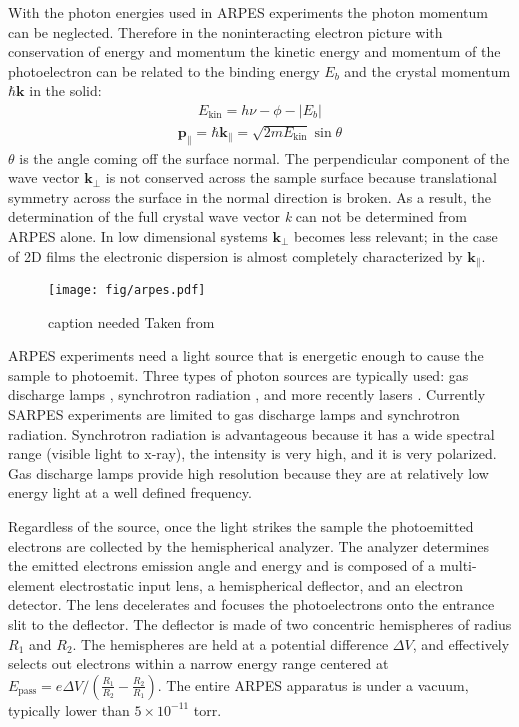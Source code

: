 \documentclass[12pt]{article}
\begin{document}
With the photon energies used in ARPES experiments the photon momentum can be neglected.
Therefore in the noninteracting electron picture with conservation of energy and momentum the kinetic energy and momentum of the photoelectron can be related to the binding energy $E_b$ and the crystal momentum $\hbar\boldsymbol{k}$ in the solid\cite{Damascelli}:
\begin{align}
  E_{\text{kin}}=h\nu-\phi-|E_b|
\end{align}
\begin{align}
  \boldsymbol{p_{\parallel}}=\hbar\boldsymbol{k_{\parallel}}=\sqrt{2mE_{\text{kin}}}\sin\theta
\end{align}
$\theta$ is the angle coming off the surface normal.
The perpendicular component of the wave vector $\boldsymbol{k_{\perp}}$ is not conserved across the sample surface because translational symmetry across the surface in the normal direction is broken.  
As a result, the determination of the full crystal wave vector \emph{k} can not be determined from ARPES alone.
In low dimensional systems $\boldsymbol{k_{\perp}}$ becomes less relevant; in the case of 2D films the electronic dispersion is almost completely characterized by $\boldsymbol{k_{\parallel}}$.

\begin{figure}[h]
  \centering
  \texttt{[image: fig/arpes.pdf]}
  \caption[should I put this here?]
  {caption needed Taken from \cite{Damascelli}}
  \label{fig:asymmetry}
\end{figure}
ARPES experiments need a light source that is energetic enough to cause the sample to photoemit.
Three types of photon sources are typically used:  gas discharge lamps \cite{Damascelli}, synchrotron radiation \cite{Damascelli}, and more recently lasers \cite{Dessau}.
Currently SARPES experiments are limited to gas discharge lamps and synchrotron radiation.
Synchrotron radiation is advantageous because it has a wide spectral range (visible light to x-ray), the intensity is very high, and it is very polarized.
Gas discharge lamps provide high resolution because they are at relatively low energy light at a well defined frequency.

Regardless of the source, once the light strikes the sample the photoemitted electrons are collected by the hemispherical analyzer.
The analyzer determines the emitted electrons emission angle and energy and is composed of a multi-element electrostatic input lens, a hemispherical deflector, and an electron detector.
The lens decelerates and focuses the photoelectrons onto the entrance slit to the deflector.
The deflector is made of two concentric hemispheres of radius $R_1$ and $R_2$.
The hemispheres are held at a potential difference $\Delta V$, and effectively selects out electrons within a narrow energy range centered at $E_{\text{pass}}=e\Delta V / (\frac{R_1}{R_2}-\frac{R_2}{R_1})$.
The entire ARPES apparatus is under a vacuum, typically lower than $5\times10^{-11}$ torr.
\end{document}
